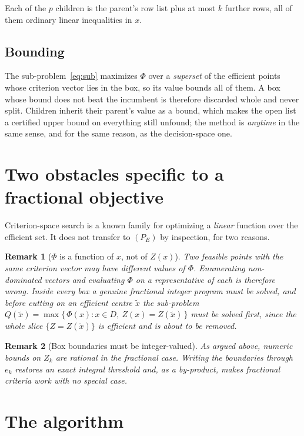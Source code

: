 \documentclass[11pt,a4paper]{article}
\newtheorem{remark}{Remark}
\newcommand{\Z}{Z}
\newcommand{\Dset}{D}
\begin{document}
\noindent
Each of the $p$ children is the parent's row list plus at most $k$ further
rows, all of them ordinary linear inequalities in $x$.

\subsection{Bounding}

The sub-problem~\eqref{eq:sub} maximizes $\Phi$ over a \emph{superset} of the
efficient points whose criterion vector lies in the box, so its value bounds
all of them. A box whose bound does not beat the incumbent is therefore
discarded whole and never split. Children inherit their parent's value as a
bound, which makes the open list a certified upper bound on everything still
unfound; the method is \emph{anytime} in the same sense, and for the same
reason, as the decision-space one.

\section{Two obstacles specific to a fractional objective}

Criterion-space search is a known family for optimizing a \emph{linear}
function over the efficient set. It does not transfer to $(P_E)$ by
inspection, for two reasons.

\begin{remark}[$\Phi$ is a function of $x$, not of $\Z(x)$]
Two feasible points with the same criterion vector may have different values of
$\Phi$. Enumerating non-dominated vectors and evaluating $\Phi$ on a
representative of each is therefore wrong. Inside every box a genuine
fractional integer program must be solved, and before cutting on an efficient
centre $\tilde{x}$ the sub-problem
$Q(\tilde{x}) = \max \{\, \Phi(x) : x \in \Dset,\ \Z(x) = \Z(\tilde{x}) \,\}$
must be solved first, since the whole slice $\{\Z = \Z(\tilde{x})\}$ is
efficient and is about to be removed.
\end{remark}

\begin{remark}[Box boundaries must be integer-valued]
As argued above, numeric bounds on $\Z_k$ are rational in the fractional case.
Writing the boundaries through $e_k$ restores an exact integral threshold and,
as a by-product, makes fractional criteria work with no special case.
\end{remark}

\section{The algorithm}
\end{document}

